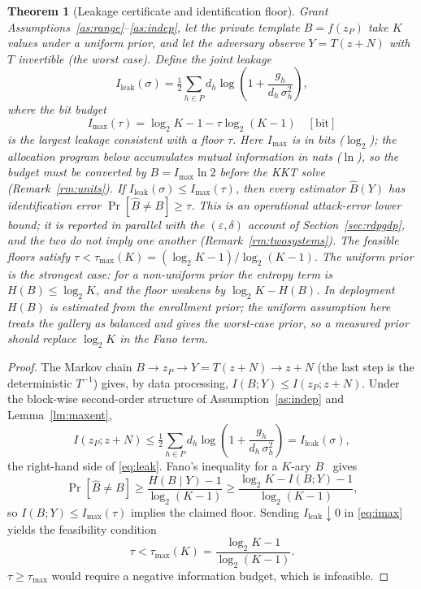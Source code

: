 \documentclass[10pt,twocolumn,letterpaper]{article}
\theoremstyle{plain}
\newtheorem{theorem}{Theorem}
\theoremstyle{definition}
\begin{document}
\begin{theorem}[Leakage certificate and identification floor]
\label{th:certificate}
Grant Assumptions~\ref{as:range}--\ref{as:indep}, let the private template
$B=f(z_P)$ take $K$ values under a \emph{uniform} prior, and let the adversary
observe $Y=T(z+N)$ with $T$ invertible (the worst case). Define the joint
leakage
\begin{equation}
I_{\mathrm{leak}}(\sigma)
=\tfrac12\!\!\sum_{h\in P}\! d_h\log\!\left(1+\frac{g_h}{d_h\,\sigma_h^{2}}\right),
\label{eq:leak}
\end{equation}
where the bit budget
\begin{equation}
I_{\max}(\tau)=\log_2 K-1-\tau\log_2(K-1)\quad[\text{bit}]
\label{eq:imax}
\end{equation}
is the largest leakage consistent with a floor $\tau$. Here $I_{\max}$ is in
bits ($\log_2$); the allocation program below accumulates mutual information in
nats ($\ln$), so the budget must be converted by $B=I_{\max}\ln2$ before the
KKT solve (Remark~\ref{rm:units}). If
$I_{\mathrm{leak}}(\sigma)\le I_{\max}(\tau)$, then \emph{every} estimator
$\widehat B(Y)$ has identification error $\Pr[\widehat B\neq B]\ge\tau$. This
is an operational attack-error lower bound; it is reported in parallel with the
$(\varepsilon,\delta)$ account of Section~\ref{sec:rdpgdp}, and the two do not
imply one another (Remark~\ref{rm:twosystems}). The feasible floors satisfy
$\tau<\tau_{\max}(K)=(\log_2K-1)/\log_2(K-1)$.
The uniform prior is the strongest case: for a non-uniform prior the entropy
term is $H(B)\le\log_2K$, and the floor weakens by $\log_2K-H(B)$. In
deployment $H(B)$ is estimated from the enrollment prior; the uniform
assumption here treats the gallery as balanced and gives the worst-case prior,
so a measured prior should replace $\log_2K$ in the Fano term.
\end{theorem}

\begin{proof}
The Markov chain $B\to z_P\to Y=T(z+N)\to z+N$ (the last step is the
deterministic $T^{-1}$) gives, by data processing,
$I(B;Y)\le I(z_P;z+N)$. Under the block-wise second-order
structure of Assumption~\ref{as:indep} and Lemma~\ref{lm:maxent},
\begin{equation}
I(z_P;z+N)\le\tfrac12\!\!\sum_{h\in P}\! d_h\log\!\left(1+\frac{g_h}{d_h\,\sigma_h^{2}}\right)
= I_{\mathrm{leak}}(\sigma),
\label{eq:cert-bound}
\end{equation}
the right-hand side of \eqref{eq:leak}. Fano's inequality for a $K$-ary
$B$~\cite{fano} gives
\begin{equation}
\Pr[\widehat B\neq B]\ge\frac{H(B\mid Y)-1}{\log_2(K-1)}
\ge\frac{\log_2 K-I(B;Y)-1}{\log_2(K-1)},
\end{equation}
so $I(B;Y)\le I_{\max}(\tau)$ implies the claimed floor. Sending
$I_{\mathrm{leak}}\downarrow0$ in \eqref{eq:imax} yields the feasibility
condition
\begin{equation}
\tau<\tau_{\max}(K)=\frac{\log_2K-1}{\log_2(K-1)}.
\label{eq:taumax}
\end{equation}
$\tau\ge\tau_{\max}$ would require a negative information budget, which is
infeasible.
\end{proof}
\end{document}
